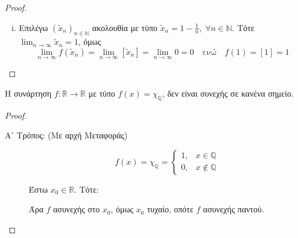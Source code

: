 \documentclass[main.tex]{subfiles}
\begin{document}
\begin{examples}
\begin{enumerate}[wide,labelwidth=!,labelindent=0pt]
\begin{proof}
\begin{enumerate}[i)]
                    \item 
                        Επιλέγω $ (\tilde{x}_{n})_{ n \in \mathbb{N}} $ 
                        ακολουθία με τύπο 
                        $ \tilde{x}_{n} = 1 - \frac{1}{n}, \; \forall n \in 
                        \mathbb{N} $. Τότε
                        $ \lim_{n \to \infty} \tilde{x}_{n} = 1 $, όμως 
                        \[
                            \lim_{n \to \infty} f(\tilde{x}_{n}) = 
                            \lim_{n \to \infty} 
                            [\tilde{x}_{n}] = \lim_{n \to \infty} 0 = 0 \quad 
                            \text{ενώ} \quad  f(1) = [1] = 1 
                        \] 
                \end{enumerate}
            \end{proof}

        \item Η συνάρτηση $ f \colon \mathbb{R} \to \mathbb{R} $ με τύπο 
            $ f(x) = \chi _{\mathbb{Q}} $, δεν είναι συνεχής σε κανένα σημείο.

            \begin{proof} 
            \item {}
                \begin{description}
                    \item [Α᾽ Τρόπος: (Με αρχή Μεταφοράς)]
                        \[
                            f(x) = \chi _{\mathbb{Q}} = \begin{cases} 1, & x \in 
                            \mathbb{Q} \\ 0, & x \not \in \mathbb{Q}\end{cases} 
                        \]

                        Έστω $ x_{0} \in \mathbb{R} $. Τότε:
                        Άρα $f$ ασυνεχής στο $ x_{0} $, όμως $ x_{0} $ τυχαίο, οπότε 
                        $f$ ασυνεχής παντού.


\end{description}
\end{proof}
\end{enumerate}
\end{examples}
\end{document}
